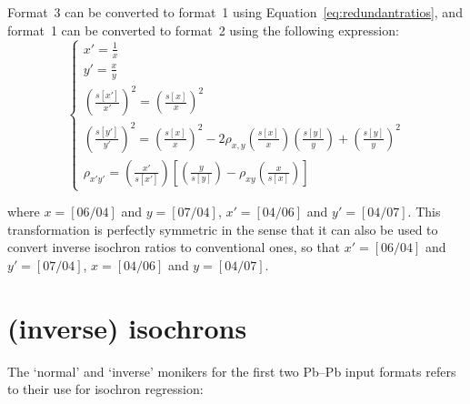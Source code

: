 \begin{refsection}
Format~3 can be converted to format~1 using
Equation~\ref{eq:redundantratios}, and format~1 can be converted to
format~2 using the following expression:
\begin{equation}
  \begin{cases}
    x' = \frac{1}{x} \\
    y' = \frac{x}{y} \\
    \left(\frac{s[x']}{x'}\right)^2 = 
    \left(\frac{s[x]}{x}\right)^2 \\
    \left(\frac{s[y']}{y'}\right)^2 =
    \left(\frac{s[x]}{x}\right)^2 -
    2 \rho_{x,y}\left(\frac{s[x]}{x}\right)\left(\frac{s[y]}{y}\right) +
    \left(\frac{s[y]}{y}\right)^2 \\
    \rho_{x'y'} =
    \left(\frac{x'}{s[x']}\right)
    \left[
    \left(\frac{y}{s[y]}\right) -
    \rho_{xy}\left(\frac{x}{s[x]}\right)
    \right]
  \end{cases}
  \label{eq:format12transformation}
\end{equation}

\noindent where $x=[06/04]$ and $y=[07/04]$, $x'=[04/06]$ and
$y'=[04/07]$. This transformation is perfectly symmetric in the sense
that it can also be used to convert inverse isochron ratios to
conventional ones, so that $x'=[06/04]$ and $y'=[07/04]$, $x=[04/06]$
and $y=[04/07]$.

\section{(inverse) isochrons}\label{sec:inverseIsochrons}

The `normal' and `inverse' monikers for the first two Pb--Pb input
formats refers to their use for isochron regression:


\end{refsection}
